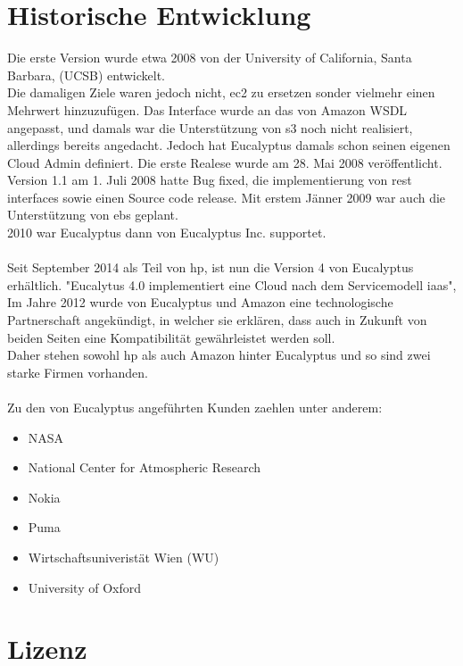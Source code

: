 \documentclass[a4paper,nochapterprefix,ngerman,12pt]{scrreprt}
\begin{document}
\section{Historische Entwicklung}
Die erste Version wurde etwa 2008 von der University of California, Santa Barbara, (UCSB) entwickelt. \\
Die damaligen Ziele waren jedoch nicht, \gls{ec2} zu ersetzen sonder vielmehr einen Mehrwert hinzuzufügen.
Das Interface wurde an das von Amazon WSDL angepasst, und damals war die Unterstützung von \gls{s3} noch nicht realisiert, allerdings bereits angedacht. Jedoch hat Eucalyptus damals schon seinen eigenen Cloud Admin definiert. Die erste Realese wurde am 28. Mai 2008 veröffentlicht. \\
Version 1.1 am 1. Juli 2008 hatte Bug fixed, die implementierung von \gls{rest} interfaces sowie einen Source code release. Mit erstem Jänner 2009 war auch die Unterstützung von \gls{ebs} geplant. 
\cite{EucalyptusSlideShare} \\
2010 war Eucalyptus dann von Eucalyptus Inc. supportet. \cite{Eucalyptus2010}
\\ \\
Seit September 2014 als Teil von \gls{hp}, ist nun die Version 4 von Eucalyptus erhältlich. "Eucalytus 4.0 implementiert eine Cloud nach dem Servicemodell \gls{iaas}", \cite{EucalyptusV4}\\
Im Jahre 2012 wurde von Eucalyptus und Amazon eine technologische Partnerschaft angekündigt, in welcher sie erklären, dass auch in Zukunft von beiden Seiten eine Kompatibilität gewährleistet werden soll.\cite{EucalyptusAWSPart} \\
Daher stehen sowohl \gls{hp} als auch Amazon hinter Eucalyptus und so sind zwei starke Firmen vorhanden.\\
\\
Zu den von Eucalyptus angeführten Kunden zaehlen unter anderem:
\begin{itemize}
\item NASA
\item National Center for Atmospheric Research 
\item Nokia
\item Puma
\item Wirtschaftsuniveristät Wien (WU)
\item University of Oxford
\end{itemize}
\cite{EucalyptusCustomers}
\section{Lizenz}
\end{document}
